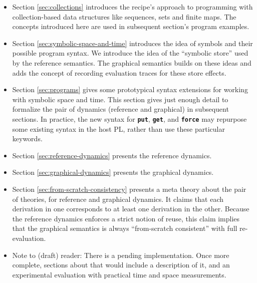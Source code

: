 \documentclass[11pt]{article}
\renewcommand{\ottkw}[1]{\textbf{\texttt{#1}}}
\begin{document}
\begin{itemize}

\item Section \ref{sec:collections} introduces the recipe's approach to programming with collection-based data structures like sequences, sets and finite maps.  The concepts introduced here are used in subsequent section's program examples.

\item Section \ref{sec:symbolic-space-and-time} introduces the idea of symbols and their possible program syntax.  We introduce the idea of the ``symbolic store'' used by the reference semantics.  The graphical semantics builds on these ideas and adds the concept of recording evaluation traces for these store effects.

\item Section \ref{sec:programs} gives some prototypical syntax
  extensions for working with symbolic space and time.
  This section gives just enough detail to
  formalize the pair of dynamics (reference and graphical) in
  subsequent sections.
  In practice,
  the new syntax for \ottkw{put}, \ottkw{get}, and \ottkw{force} may
  repurpose some existing syntax in the host PL, rather than use these
  particular keywords.

\item Section \ref{sec:reference-dynamics} presents the reference dynamics.

\item Section \ref{sec:graphical-dynamics} presents the graphical dynamics.

\item Section \ref{sec:from-scratch-consistency} presents a meta theory
  about the pair of theories, for reference and graphical dynamics.
  It claims that each derivation in one corresponds
  to at least one derivation in the other.  Because the reference
  dynamics enforces a strict notion of reuse, this claim implies that
  the graphical semantics is always ``from-scratch consistent'' with
  full re-evaluation.

\item Note to (draft) reader: There is a pending implementation.  Once more
  complete, sections about that would include a description of it, and
  an experimental evaluation with practical time and space
  measurements.

\end{itemize}

\newpage
\end{document}
